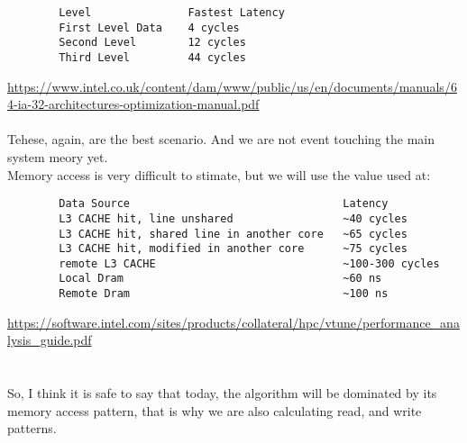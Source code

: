 \documentclass{article}
\begin{document}
	\begin{verbatim}
		Level               Fastest Latency
		First Level Data    4 cycles
		Second Level        12 cycles
		Third Level         44 cycles
	\end{verbatim}
	\url{https://www.intel.co.uk/content/dam/www/public/us/en/documents/manuals/64-ia-32-architectures-optimization-manual.pdf}\\
	\\
	Tehese, again, are the best scenario. And we are not event touching the main system meory yet.\\
	Memory access is very difficult to stimate, but we will use the value used at:\\
	\begin{verbatim}
		Data Source                                 Latency
		L3 CACHE hit, line unshared                 ~40 cycles
		L3 CACHE hit, shared line in another core   ~65 cycles
		L3 CACHE hit, modified in another core      ~75 cycles
		remote L3 CACHE                             ~100-300 cycles
		Local Dram                                  ~60 ns
		Remote Dram                                 ~100 ns 
	\end{verbatim}
	\url{https://software.intel.com/sites/products/collateral/hpc/vtune/performance_analysis_guide.pdf}\\
	\\\\
	So, I think it is safe to say that today, the algorithm will be dominated by its memory access pattern, that is why we are also calculating read, and write patterns.
\end{document}

